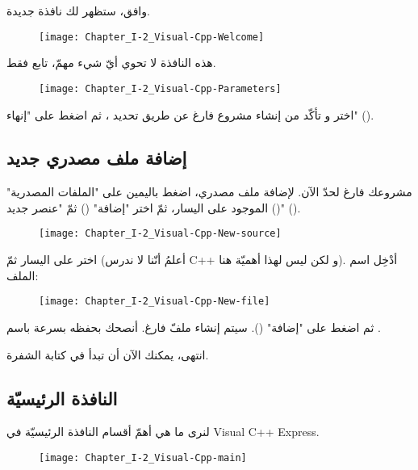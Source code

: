 وافق، ستظهر لك نافذة جديدة.

\begin{figure}[H]
	\centering
	\texttt{[image: Chapter\_I-2\_Visual-Cpp-Welcome]}
\end{figure}

هذه النافذة لا تحوي أيّ شيء مهمّ، تابع فقط.

\begin{figure}[H]
	\centering
	\texttt{[image: Chapter\_I-2\_Visual-Cpp-Parameters]}
\end{figure}

اختر
و تأكّد من إنشاء مشروع فارغ عن طريق تحديد
،
ثم اضغط على
"إنهاء"
().

\subsection{إضافة ملف مصدري جديد}

مشروعك فارغ لحدّ الآن. لإضافة ملف مصدري، اضغط باليمين على
"الملفات المصدرية"
()
الموجود على اليسار، ثمّ اختر
"إضافة"
()
ثمّ
"عنصر جديد"
().

\begin{figure}[H]
	\centering
	\texttt{[image: Chapter\_I-2\_Visual-Cpp-New-source]}
\end{figure}

اختر
على اليسار ثمّ
(أعلمُ أنّنا لا ندرس
\textenglish{C++}
و لكن ليس لهذا أهميّة هنا). أدْخِل اسم الملف:

\begin{figure}[H]
	\centering
	\texttt{[image: Chapter\_I-2\_Visual-Cpp-New-file]}
\end{figure}


ثم اضغط على
"إضافة"
().
سيتم إنشاء ملفّ فارغ. أنصحك بحفظه بسرعة باسم
.

انتهى، يمكنك الآن أن تبدأ في كتابة الشفرة.

\subsection{النافذة الرئيسيّة}

لنرى ما هي أهمّ أقسام النافذة الرئيسيّة في
\textenglish{Visual C++ Express}.

\begin{figure}[H]
	\centering
	\texttt{[image: Chapter\_I-2\_Visual-Cpp-main]}
\end{figure}

